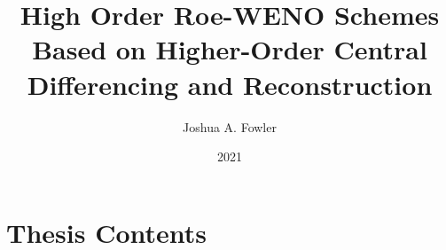 \documentclass[12pt,oneside]{book}
\title{
  High Order Roe-WENO Schemes Based on
  Higher-Order Central Differencing and Reconstruction
}
\author{Joshua A. Fowler}
\date{2021}
\begin{document}
\frontmatter

\chapter*{Thesis Contents}
\tableofcontents

\mainmatter








\backmatter



\end{document}
